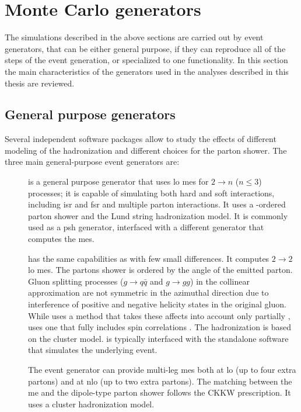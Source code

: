 \section{Monte Carlo generators}
\label{sec:mcgen}

The simulations described in the above sections are carried out by event generators, that can be either general purpose, 
if they can reproduce all of the steps of the event generation, or specialized to one functionality. 
In this section the main characteristics of the generators used in the analyses described in this thesis are reviewed.

\subsection{General purpose generators}

Several independent software packages allow to study the effects of different modeling of the hadronization and different choices for the parton shower. The three main general-purpose event generators are:

\begin{description}
\item[\PY] \cite{Sjostrand:2006za,Sjostrand:2014zea} is a general purpose generator that uses \gls{lo} \glspl{me} for $2\rightarrow n $ ($n \leq 3$) processes; 
it is capable of simulating both hard and soft interactions, including \gls{isr} and \gls{fsr} and multiple parton interactions.
It uses a \pt-ordered parton shower and the Lund string hadronization model. It is commonly used as a \gls{psh} generator, interfaced with a different generator that computes the \glspl{me}.

\item[\HW] \cite{Corcella:2000bw,Bahr:2008pv,Bellm:2015jjp} has the same capabilities as \PY with few small differences. 
It computes $2\rightarrow 2$ \gls{lo} \glspl{me}.
 The partons shower is ordered by the angle of the emitted parton. Gluon splitting processes ($g \rightarrow q\bar{q}$ and $g \rightarrow gg$) in the collinear approximation are not symmetric in the azimuthal direction due to interference of positive and negative helicity states in the original gluon. 
While \PY uses a method that takes these affects into account only partially \cite{Webber:1987uy}, \HW uses one that fully includes spin correlations \cite{Collins:1987cp}. The hadronization is based on the cluster model.
\HW is typically interfaced with the standalone software \jimmy \cite{Butterworth:1996zw} that simulates the underlying event.

\item[\Sherpa] \cite{Gleisberg:2008ta} The \Sherpa event generator can provide multi-leg \glspl{me} both at \gls{lo} (up to four extra partons) and at \gls{nlo} (up to two extra partons). 
The matching between the \gls{me} and the dipole-type parton shower \cite{Schumann:2007mg} follows the CKKW prescription.
It uses a cluster hadronization model. 

\end{description}

